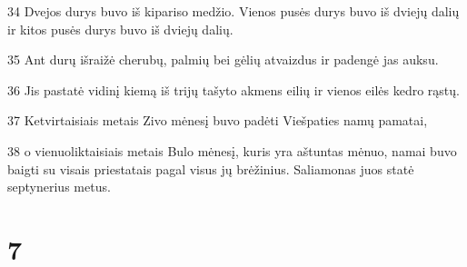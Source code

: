 \par 34 Dvejos durys buvo iš kipariso medžio. Vienos pusės durys buvo iš dviejų dalių ir kitos pusės durys buvo iš dviejų dalių. 
\par 35 Ant durų išraižė cherubų, palmių bei gėlių atvaizdus ir padengė jas auksu. 
\par 36 Jis pastatė vidinį kiemą iš trijų tašyto akmens eilių ir vienos eilės kedro rąstų. 
\par 37 Ketvirtaisiais metais Zivo mėnesį buvo padėti Viešpaties namų pamatai, 
\par 38 o vienuoliktaisiais metais Bulo mėnesį, kuris yra aštuntas mėnuo, namai buvo baigti su visais priestatais pagal visus jų brėžinius. Saliamonas juos statė septynerius metus.



\chapter{7}


